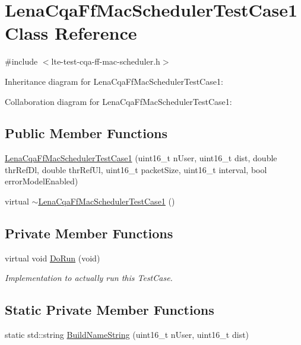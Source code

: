 \hypertarget{classLenaCqaFfMacSchedulerTestCase1}{}\section{Lena\+Cqa\+Ff\+Mac\+Scheduler\+Test\+Case1 Class Reference}
\label{classLenaCqaFfMacSchedulerTestCase1}


{\ttfamily \#include $<$lte-\/test-\/cqa-\/ff-\/mac-\/scheduler.\+h$>$}



Inheritance diagram for Lena\+Cqa\+Ff\+Mac\+Scheduler\+Test\+Case1\+:


Collaboration diagram for Lena\+Cqa\+Ff\+Mac\+Scheduler\+Test\+Case1\+:
\subsection*{Public Member Functions}
\begin{DoxyCompactItemize}
\item 
\hyperlink{classLenaCqaFfMacSchedulerTestCase1_ac5d64a8048069e6075ac88d56cca5139}{Lena\+Cqa\+Ff\+Mac\+Scheduler\+Test\+Case1} (uint16\+\_\+t n\+User, uint16\+\_\+t dist, double thr\+Ref\+Dl, double thr\+Ref\+Ul, uint16\+\_\+t packet\+Size, uint16\+\_\+t interval, bool error\+Model\+Enabled)
\item 
virtual \hyperlink{classLenaCqaFfMacSchedulerTestCase1_ab2335170af5320f8bdddc7fdadc09014}{$\sim$\+Lena\+Cqa\+Ff\+Mac\+Scheduler\+Test\+Case1} ()
\end{DoxyCompactItemize}
\subsection*{Private Member Functions}
\begin{DoxyCompactItemize}
\item 
virtual void \hyperlink{classLenaCqaFfMacSchedulerTestCase1_a91b3e2ef4ff292dbeda5559ff0eae1e6}{Do\+Run} (void)
\begin{DoxyCompactList}\small\item\em Implementation to actually run this Test\+Case. \end{DoxyCompactList}\end{DoxyCompactItemize}
\subsection*{Static Private Member Functions}
\begin{DoxyCompactItemize}
\item 
static std\+::string \hyperlink{classLenaCqaFfMacSchedulerTestCase1_a3916478b0577f460fd419f68148c8a68}{Build\+Name\+String} (uint16\+\_\+t n\+User, uint16\+\_\+t dist)
\end{DoxyCompactItemize}
